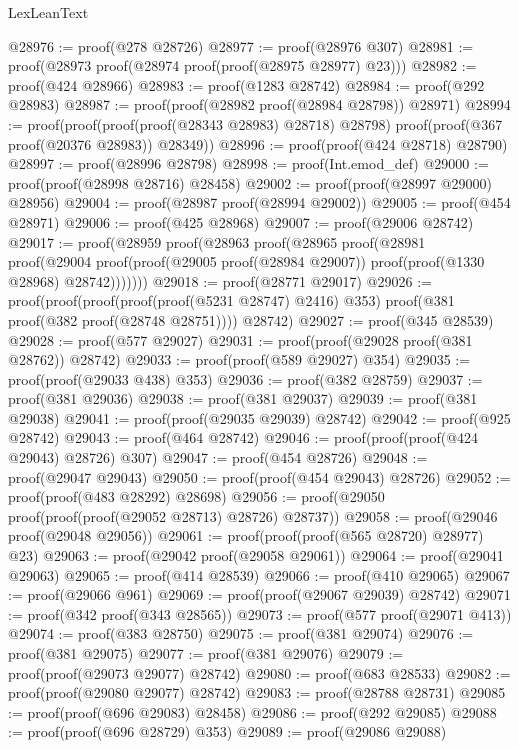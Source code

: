 \begin{lexlean}{LexLeanText}
\begin{coremodule}
@28976 := proof(@278 @28726)
@28977 := proof(@28976 @307)
@28981 := proof(@28973 proof(@28974 proof(proof(@28975 @28977) @23)))
@28982 := proof(@424 @28966)
@28983 := proof(@1283 @28742)
@28984 := proof(@292 @28983)
@28987 := proof(proof(@28982 proof(@28984 @28798)) @28971)
@28994 := proof(proof(proof(proof(@28343 @28983) @28718) @28798)
      proof(proof(@367 proof(@20376 @28983)) @28349))
@28996 := proof(proof(@424 @28718) @28790)
@28997 := proof(@28996 @28798)
@28998 := proof(Int.emod_def)
@29000 := proof(proof(@28998 @28716) @28458)
@29002 := proof(proof(@28997 @29000) @28956)
@29004 := proof(@28987 proof(@28994 @29002))
@29005 := proof(@454 @28971)
@29006 := proof(@425 @28968)
@29007 := proof(@29006 @28742)
@29017 := proof(@28959
      proof(@28963
          proof(@28965
              proof(@28981
                  proof(@29004
                      proof(proof(@29005 proof(@28984 @29007))
                          proof(proof(@1330 @28968) @28742)))))))
@29018 := proof(@28771 @29017)
@29026 := proof(proof(proof(proof(proof(@5231 @28747) @2416) @353)
        proof(@381 proof(@382 proof(@28748 @28751))))
      @28742)
@29027 := proof(@345 @28539)
@29028 := proof(@577 @29027)
@29031 := proof(proof(@29028 proof(@381 @28762)) @28742)
@29033 := proof(proof(@589 @29027) @354)
@29035 := proof(proof(@29033 @438) @353)
@29036 := proof(@382 @28759)
@29037 := proof(@381 @29036)
@29038 := proof(@381 @29037)
@29039 := proof(@381 @29038)
@29041 := proof(proof(@29035 @29039) @28742)
@29042 := proof(@925 @28742)
@29043 := proof(@464 @28742)
@29046 := proof(proof(proof(@424 @29043) @28726) @307)
@29047 := proof(@454 @28726)
@29048 := proof(@29047 @29043)
@29050 := proof(proof(@454 @29043) @28726)
@29052 := proof(proof(@483 @28292) @28698)
@29056 := proof(@29050 proof(proof(proof(@29052 @28713) @28726) @28737))
@29058 := proof(@29046 proof(@29048 @29056))
@29061 := proof(proof(proof(@565 @28720) @28977) @23)
@29063 := proof(@29042 proof(@29058 @29061))
@29064 := proof(@29041 @29063)
@29065 := proof(@414 @28539)
@29066 := proof(@410 @29065)
@29067 := proof(@29066 @961)
@29069 := proof(proof(@29067 @29039) @28742)
@29071 := proof(@342 proof(@343 @28565))
@29073 := proof(@577 proof(@29071 @413))
@29074 := proof(@383 @28750)
@29075 := proof(@381 @29074)
@29076 := proof(@381 @29075)
@29077 := proof(@381 @29076)
@29079 := proof(proof(@29073 @29077) @28742)
@29080 := proof(@683 @28533)
@29082 := proof(proof(@29080 @29077) @28742)
@29083 := proof(@28788 @28731)
@29085 := proof(proof(@696 @29083) @28458)
@29086 := proof(@292 @29085)
@29088 := proof(proof(@696 @28729) @353)
@29089 := proof(@29086 @29088)

\end{coremodule}
\end{lexlean}
